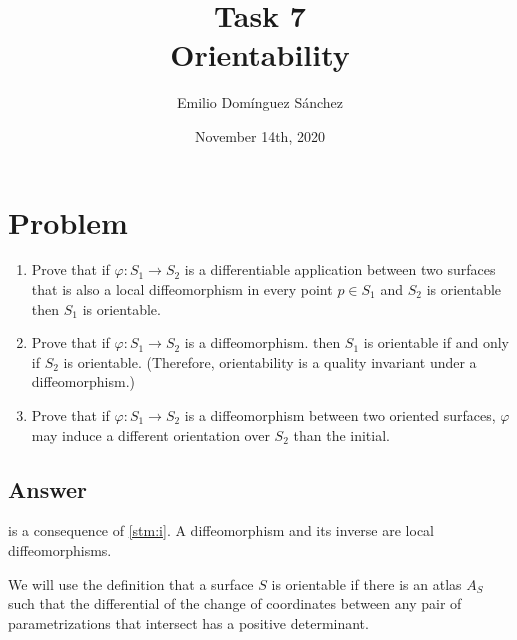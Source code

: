 \documentclass[
    12pt, %
]{fphw}
\title{Task 7 \\ Orientability} %
\author{Emilio Domínguez Sánchez} %
\date{November 14th, 2020} %
\institute{University of Murcia \\ Faculty of Mathematics} %
\begin{document}
\maketitle %


\section*{Problem}

\begin{problem}
    \begin{enumerate}
        \item \label{stm:i} Prove that if $φ : S_1 \to S_2$ is
        a differentiable application between two surfaces that is also
        a local diffeomorphism in every point $p \in S_1$ and
        $S_2$ is orientable then
        $S_1$ is orientable.

        \item \label{stm:ii} Prove that if $φ : S_1 \to S_2$ is a diffeomorphism.
        then $S_1$ is orientable if and only if $S_2$ is orientable.
        (Therefore, orientability is a quality invariant under a diffeomorphism.)

        \item \label{stm:iii} Prove that if $φ : S_1 \to S_2$ is a diffeomorphism between
        two oriented surfaces,
        $φ$ may induce a different orientation over $S_2$ than the initial.
    \end{enumerate}
\end{problem}


\subsection*{Answer}

     is a consequence of \cref{stm:i}.
A diffeomorphism and its inverse are local diffeomorphisms.

    We will use the definition that
a surface $S$ is orientable if there is an atlas $A_S$ such that the
differential of the change of coordinates
between any pair of parametrizations that intersect
has a positive determinant.
\end{document}
